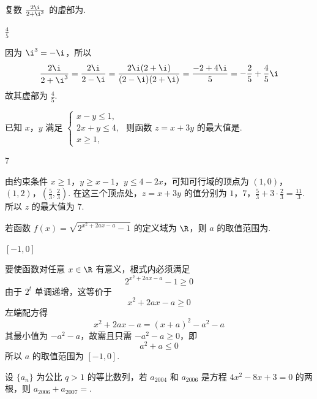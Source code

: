 \begin{problem}
复数 \(\frac{2\i}{2 + \i^{3}}\) 的虚部为\fillinblank{}.
\end{problem}

\begin{answer}
\(\frac{4}{5}\)
\end{answer}

\begin{solution}
因为 \(\i^3=-\i\)，所以
\[
\frac{2\i}{2+\i^3}=\frac{2\i}{2-\i}=\frac{2\i(2+\i)}{(2-\i)(2+\i)}=\frac{-2+4\i}{5}=-\frac25+\frac45\i
\]
故其虚部为 \(\frac45\).
\end{solution}

\begin{problem}
已知 \(x\)，\(y\) 满足 \(\begin{cases}
x - y \leqslant 1,\\
2x + y \leqslant 4,\\
x \geqslant 1,
\end{cases}\) 则函数 \(z = x + 3y\) 的最大值是\fillinblank{}.
\end{problem}

\begin{answer}
7
\end{answer}

\begin{solution}
由约束条件 \(x\geqslant1\)，\(y\geqslant x-1\)，\(y\leqslant4-2x\)，可知可行域的顶点为
\((1,0)\)，\((1,2)\)，\(\left(\frac53,\frac23\right)\).
在这三个顶点处，\(z=x+3y\) 的值分别为
\(1\)，\(7\)，\(\frac53+3\cdot\frac23=\frac{11}{3}\).
所以 \(z\) 的最大值为 \(7\).
\end{solution}

\begin{problem}
若函数 \( f(x) = \sqrt{2^{x^{2} + 2ax - a} - 1} \) 的定义域为 \( \R \)，则 \( a \) 的取值范围为\fillinblank{}.
\end{problem}

\begin{answer}
\([-1,0]\)
\end{answer}

\begin{solution}
要使函数对任意 \(x\in\R\) 有意义，根式内必须满足
\[
2^{x^2+2ax-a}-1\geqslant0
\]
由于 \(2^t\) 单调递增，这等价于
\[
x^2+2ax-a\geqslant0
\]
左端配方得
\[
x^2+2ax-a=(x+a)^2-a^2-a
\]
其最小值为 \(-a^2-a\)，故需且只需 \(-a^2-a\geqslant0\)，即
\[
a^2+a\leqslant0
\]
所以 \(a\) 的取值范围为 \([-1,0]\).
\end{solution}

\begin{problem}
设 \( \{a_{n}\} \) 为公比 \(q > 1\) 的等比数列，若 \( a_{2004} \) 和 \( a_{2006} \) 是方程 \( 4x^{2} - 8x + 3 = 0 \) 的两根，则 \( a_{2006} + a_{2007} = \)\fillinblank{}.
\end{problem}

